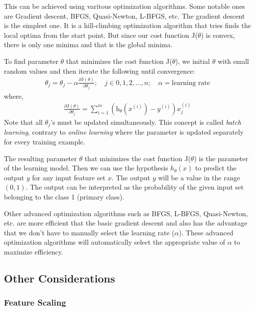 This can be achieved using varitous optimization algorithms. Some notable
ones are Gradient descent, BFGS, Quasi-Newton, L-BFGS, etc. The gradient
descent is the simplest one. It is a hill-climbing optimization algorithm
that tries finds the local optima from the start point. But since our
cost function J($\theta$) is convex, there is only one minima and that is the
global minima.

To find parameter $\theta$ that minimizes the cost function J($\theta$),
we initial $\theta$ with small random values and then
iterate the following until convergence:
\begin{align}
  \theta_j = \theta_j - \alpha \frac{\partial \text{J}(\theta)}{\partial \theta_j};
  \quad j \in {0,1,2,\ldots,n}; \quad \alpha = \text{learning rate}
  \nonumber
\end{align}
where,
\begin{align}
  \frac{\partial \text{J}(\theta)}{\partial \theta_j} =
  \sum_{i=1}^{m} \left( \text{h}_\theta \left(x^{(i)}\right) - y^{(i)} \right) x^{(i)}_j
\end{align}
Note that all $\theta_j$'s must be updated simultaneously. This concept is called
{\em batch learning}, contrary to {\em online learning} where the parameter is updated
separately for every training example.

The resulting parameter $\theta$ that minimizes the cost function J($\theta$) is
the parameter of the learning model. Then we can use the hypothesis $h_\theta(x)$
to predict the output $y$ for any input feature set $x$. The output $y$ will be
a value in the range $(0,1)$. The output can be interpreted as the probability
of the given input set belonging to the class 1 (primary class).

Other advanced optimization algorithms such as BFGS, L-BFGS, Quasi-Newton, etc.
are more efficient that the basic gradient descent and also has the advantage that
we don't have to manually select the learning rate ($\alpha$). These advanced
optimization algorithms will automatically select the appropriate value of $\alpha$
to maximize efficiency.

\subsection{Other Considerations}


\subsubsection{Feature Scaling}

